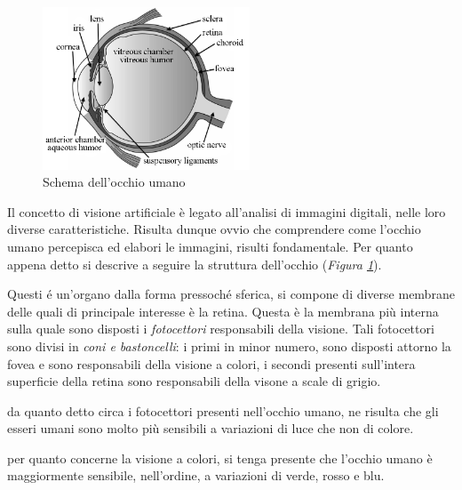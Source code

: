 \documentclass{subfiles}
\begin{document}
\label{sec:1}
\begin{figure}
    \centering
    \includegraphics[width = 0.55\textwidth]{../../Figure/Other/Diagram of the human eye.png}
    \caption{Schema dell'occhio umano}
    \label{fig:1.1}
\end{figure}
Il concetto di visione artificiale è legato all'analisi di immagini digitali, nelle loro diverse caratteristiche.
Risulta dunque ovvio che comprendere come l'occhio umano percepisca ed elabori le immagini, risulti fondamentale.
Per quanto appena detto si descrive a seguire la struttura dell'occhio (\emph{Figura \ref{fig:1.1}}).

Questi é un'organo dalla forma pressoché sferica, si compone di diverse membrane delle quali di principale interesse è la retina.
Questa è la membrana più interna sulla quale sono disposti i \emph{fotocettori} responsabili della visione.
Tali fotocettori sono divisi in \emph{coni \emph{e} bastoncelli}: i primi in minor numero,
sono disposti attorno la fovea e sono responsabili della visione a colori,
i secondi presenti sull'intera superficie della retina sono responsabili della visone a scale di grigio.
\begin{Remark*}
    da quanto detto circa i fotocettori presenti nell'occhio umano,
    ne risulta che gli esseri umani sono molto più sensibili a variazioni di luce che non di colore.
\end{Remark*}

\begin{Remark*}
    per quanto concerne la visione a colori, si tenga presente che l'occhio umano è maggiormente sensibile, nell'ordine, a variazioni di verde, rosso e blu.
\end{Remark*}
\clearpage
\end{document}
